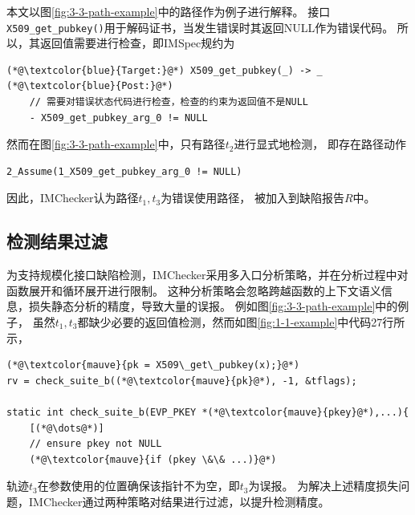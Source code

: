 本文以图\ref{fig:3-3-path-example}中的路径作为例子进行解释。
接口\texttt{X509\_get\_pubkey()}用于解码证书，当发生错误时其返回NULL作为错误代码。
所以，其返回值需要进行检查，即IMSpec规约为
\begin{lstlisting}[language={[ANSI]C},
basicstyle=\linespread{0.8}\listingsfont,
numbers=none,
xleftmargin=.15\textwidth]
(*@\textcolor{blue}{Target:}@*) X509_get_pubkey(_) -> _
(*@\textcolor{blue}{Post:}@*) 
	// 需要对错误状态代码进行检查，检查的约束为返回值不是NULL
	- X509_get_pubkey_arg_0 != NULL
\end{lstlisting}
然而在图\ref{fig:3-3-path-example}中，只有路径$t_2$进行显式地检测，
即存在路径动作
\begin{lstlisting}[language={[ANSI]C},
basicstyle=\linespread{0.8}\listingsfont,
numbers=none,
xleftmargin=.15\textwidth]
2_Assume(1_X509_get_pubkey_arg_0 != NULL)
\end{lstlisting}
因此，IMChecker认为路径$t_1, t_3$为错误使用路径，
被加入到缺陷报告$R$中。

\subsection{检测结果过滤}
为支持规模化接口缺陷检测，IMChecker采用多入口分析策略，并在分析过程中对函数展开和循环展开进行限制。
这种分析策略会忽略跨越函数的上下文语义信息，损失静态分析的精度，导致大量的误报。
例如图\ref{fig:3-3-path-example}中的例子，
虽然$t_1, t_3$都缺少必要的返回值检测，然而如图\ref{fig:1-1-example}中代码27行所示，
\begin{lstlisting}[language={[ANSI]C},
basicstyle=\linespread{0.7}\listingsfont,
numbers=none,
xleftmargin=.25\textwidth]
(*@\textcolor{mauve}{pk = X509\_get\_pubkey(x);}@*)
rv = check_suite_b((*@\textcolor{mauve}{pk}@*), -1, &tflags);
	
static int check_suite_b(EVP_PKEY *(*@\textcolor{mauve}{pkey}@*),...){
	[(*@\dots@*)]
	// ensure pkey not NULL
	(*@\textcolor{mauve}{if (pkey \&\& ...)}@*)
\end{lstlisting}
轨迹$t_3$在参数使用的位置确保该指针不为空，即$t_3$为误报。
为解决上述精度损失问题，IMChecker通过两种策略对结果进行过滤，以提升检测精度。

